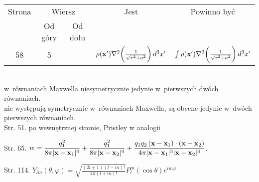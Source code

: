 \documentclass[a4paper,11pt]{article}
\begin{document}
\newpage



\begin{center}

  \begin{tabular}{|c|c|c|c|c|}
    \hline
    Strona & \multicolumn{2}{c|}{Wiersz} & Jest
                              & Powinno być \\ \cline{2-3}
    & Od góry & Od dołu & & \\
    \hline
    58 & 5 & & $\rho( \bold{ x }' ) \nabla^{ 2 } \bigg(
               \frac{ 1 }{ \sqrt{ r^{ 2 } + a^{ 2 } } } \bigg) \, d^{ 3 } x'$
    & $\int \rho( \bold{ x }' ) \nabla^{ 2 } \bigg(
      \frac{ 1 }{ \sqrt{ r^{ 2 } + a^{ 2 } } } \bigg) \, d^{ 3 } x'$ \\
    \hline
  \end{tabular}

\end{center}

\vspace{\spaceTwo}


\noindent
{} \\
\Jest  w~równaniach Maxwella niesymetrycznie jedynie w~pierwszych dwóch
równaniach. \\
\Powin nie występują symetrycznie w~równaniach Maxwella, są obecne jedynie
w~dwóch pierwszych równaniach. \\

Str. 51. po wewnętrznej stronie, Pristley w analogii

Str. 65. $\displaystyle w = \frac{ q^{ 2 }_{ 1 } }{ 8 \pi | \mathbf{x} - \mathbf{x}_{ 1 } |^{ 4 } } + \frac{ q^{ 2 }_{ 1 } }{ 8 \pi | \mathbf{x} - \mathbf{x}_{ 2 } |^{ 4 } } + \frac{ q_{ 1 } q_{ 2 } \, ( \mathbf{x} - \mathbf{x}_{ 1 } ) \cdot ( \mathbf{x} - \mathbf{x}_{ 2 } ) }{ 4 \pi | \mathbf{x} - \mathbf{x}_{ 1 } |^{ 3 } | \mathbf{x} - \mathbf{x}_{ 2 } |^{ 3 } }$.

Str. 114. $\displaystyle Y_{ l m }( \theta, \varphi ) = \sqrt{ \frac{ ( 2l + 1 ) ( l - m )! }{ 4 \pi ( l + m )! } } P^{ m }_{ l }( \cos \theta ) e^{ i m \varphi }$


\end{document}
